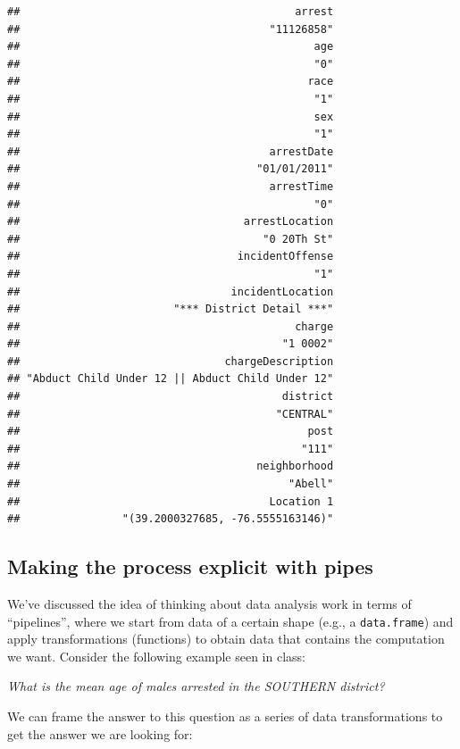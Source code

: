 \documentclass[]{article}
\theoremstyle{definition}
\theoremstyle{definition}
\theoremstyle{remark}
\begin{document}
\begin{verbatim}
##                                           arrest 
##                                       "11126858" 
##                                              age 
##                                              "0" 
##                                             race 
##                                              "1" 
##                                              sex 
##                                              "1" 
##                                       arrestDate 
##                                     "01/01/2011" 
##                                       arrestTime 
##                                              "0" 
##                                   arrestLocation 
##                                      "0 20Th St" 
##                                  incidentOffense 
##                                              "1" 
##                                 incidentLocation 
##                        "*** District Detail ***" 
##                                           charge 
##                                         "1 0002" 
##                                chargeDescription 
## "Abduct Child Under 12 || Abduct Child Under 12" 
##                                         district 
##                                        "CENTRAL" 
##                                             post 
##                                            "111" 
##                                     neighborhood 
##                                          "Abell" 
##                                       Location 1 
##                "(39.2000327685, -76.5555163146)"
\end{verbatim}

\subsection{Making the process explicit with
pipes}\label{making-the-process-explicit-with-pipes}

We've discussed the idea of thinking about data analysis work in terms
of ``pipelines'', where we start from data of a certain shape (e.g., a
\texttt{data.frame}) and apply transformations (functions) to obtain
data that contains the computation we want. Consider the following
example seen in class:

\emph{What is the mean age of males arrested in the SOUTHERN district?}

We can frame the answer to this question as a series of data
transformations to get the answer we are looking for:
\end{document}
